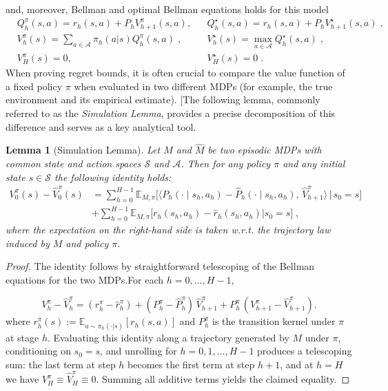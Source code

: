 \documentclass{article}
\numberwithin{equation}{section}
\newtheorem{lemma}{Lemma}
\newcommand{\cA}{\mathcal{A}}
\newcommand{\eqsp}{\;}
\begin{document}
and, moreover, Bellman and optimal Bellman equations holds for this model
\begin{align*}\label{bel_eq}
    &Q^\pi_h(s,a) = r_h(s,a) + P_hV^\pi_{h+1}(s,a) , &  &Q^\star_h(s,a) =  r_h(s,a) + P_hV^\star_{h+1}(s,a)\eqsp, \\
    &V^\pi_h(s) = \sum_{a\in\cA}\pi_h(a|s)Q^\pi_h(s,a)\eqsp, & &V^\star_h(s) = \max_{a \in \cA} Q^\star_h(s, a)\eqsp,  \\
    &V^\pi_{H}(s) = 0, & &V^\star_{H}(s) = 0\eqsp.
\end{align*}
When proving regret bounds, it is often crucial to compare the value function of a fixed policy $\pi$ when evaluated in two different MDPs (for example, the true environment and its empirical estimate).  
[The following lemma, commonly referred to as the \emph{Simulation Lemma}, provides a precise decomposition of this difference and serves as a key analytical tool.
\begin{lemma}[Simulation Lemma]\label{lem:simulation}
Let $M$ and $\widehat M$ be two episodic MDPs with common state and action spaces $\mathcal S$ and $\mathcal A$. Then for any policy \(\pi\) and any initial state $s\in\mathcal S$ the following identity holds:
\begin{align*}
V_0^\pi(s)-\widehat{V}_0^\pi(s) &= 
\sum_{h=0}^{H-1}\mathbb{E}_{M,\pi}\big[\big\langle P_h(\cdot\mid s_h,a_h)-\widehat P_h(\cdot\mid s_h,a_h),\,
\widehat V_{h+1}^\pi\big\rangle
\,\big|\,s_0=s\big] \\
&+\sum_{h=0}^{H-1}\mathbb{E}_{M,\pi}
\big[ r_h(s_h,a_h)-\widehat r_h(s_h,a_h)\big| s_0=s\big]\eqsp,
\end{align*}
where the expectation on the right-hand side is taken w.r.t. the trajectory law induced by $M$ and policy $\pi$.
\end{lemma}

\begin{proof}
The identity follows by straightforward telescoping of the Bellman equations for the two MDPs.For each $h=0,\dots,H-1$,

\[
V_h^\pi - \widehat V_h^\pi
= (r_h^\pi-\widehat r_h^\pi)
+ (P_h^\pi-\widehat P_h^\pi)\,\widehat V_{h+1}^\pi
+ P_h^\pi\,(V_{h+1}^\pi-\widehat V_{h+1}^\pi).
\]
where $r_h^\pi(s) := \mathbb{E}_{a\sim\pi_h(\cdot|s)}[r_h(s,a)]$ and $P_h^\pi$ is the transition kernel under $\pi$ at stage $h$.  
Evaluating this identity along a trajectory generated by $M$ under $\pi$, conditioning on $s_0=s$, and unrolling for $h=0,1,\dots,H-1$ produces a telescoping sum: the last term at step $h$ becomes the first term at step $h+1$, and at $h=H$ we have $V_H^\pi \equiv \widehat V_H^\pi \equiv 0$. Summing all additive terms yields the claimed equality.
\end{proof}
\end{document}
